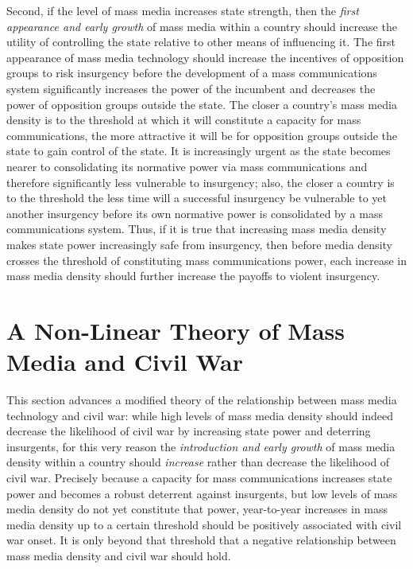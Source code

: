 \documentclass[12pt,article,oneside]{memoir}
\begin{document}
Second, if the level of mass media increases state strength, then the
\emph{first appearance and early growth} of mass media within a country
should increase the utility of controlling the state relative to other
means of influencing it. The first appearance of mass media technology
should increase the incentives of opposition groups to risk insurgency
before the development of a mass communications system significantly
increases the power of the incumbent and decreases the power of
opposition groups outside the state. The closer a country's mass media
density is to the threshold at which it will constitute a capacity for
mass communications, the more attractive it will be for opposition
groups outside the state to gain control of the state. It is
increasingly urgent as the state becomes nearer to consolidating its
normative power via mass communications and therefore significantly less
vulnerable to insurgency; also, the closer a country is to the threshold
the less time will a successful insurgency be vulnerable to yet another
insurgency before its own normative power is consolidated by a mass
communications system. Thus, if it is true that increasing mass media
density makes state power increasingly safe from insurgency, then before
media density crosses the threshold of constituting mass communications
power, each increase in mass media density should further increase the
payoffs to violent insurgency.

\section{A Non-Linear Theory of Mass Media and Civil
War}\label{a-non-linear-theory-of-mass-media-and-civil-war}

This section advances a modified theory of the relationship between mass
media technology and civil war: while high levels of mass media density
should indeed decrease the likelihood of civil war by increasing state
power and deterring insurgents, for this very reason the
\emph{introduction and early growth} of mass media density within a
country should \emph{increase} rather than decrease the likelihood of
civil war. Precisely because a capacity for mass communications
increases state power and becomes a robust deterrent against insurgents,
but low levels of mass media density do not yet constitute that power,
year-to-year increases in mass media density up to a certain threshold
should be positively associated with civil war onset. It is only beyond
that threshold that a negative relationship between mass media density
and civil war should hold.
\end{document}
